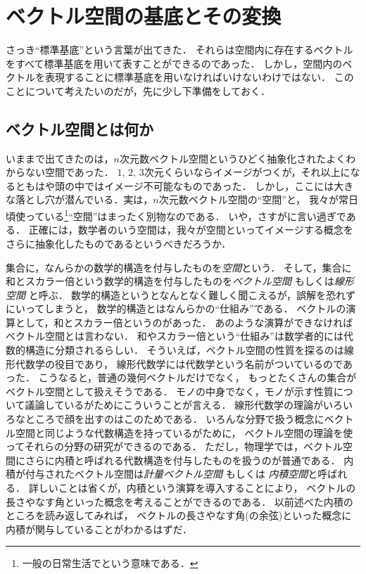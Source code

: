 \section{ベクトル空間の基底とその変換}
さっき``標準基底''という言葉が出てきた．
それらは空間内に存在するベクトルをすべて標準基底を用いて表すことができるのであった．
しかし，空間内のベクトルを表現することに標準基底を用いなければいけないわけではない．
このことについて考えたいのだが，先に少し下準備をしておく．
\subsection{ベクトル空間とは何か}
いままで出てきたのは，$n$次元数ベクトル空間というひどく抽象化されたよくわからない空間であった．
$1,\, 2, \, 3$次元くらいならイメージがつくが，それ以上になるともはや頭の中ではイメージ不可能なものであった．
しかし，ここには大きな落とし穴が潜んでいる．実は，$n$次元数ベクトル空間の``空間''と，
我々が常日頃使っている\footnote{一般の日常生活でという意味である．}``空間''はまったく別物なのである．
いや，さすがに言い過ぎである．
正確には，数学者のいう空間は，我々が空間といってイメージする概念をさらに抽象化したものであるというべきだろうか．

集合に，なんらかの数学的構造を付与したものを\emph{空間}という．
そして，集合に和とスカラー倍という数学的構造を付与したものを\emph{ベクトル空間}
もしくは\emph{線形空間}
と呼ぶ．
数学的構造というとなんとなく難しく聞こえるが，誤解を恐れずにいってしまうと，
数学的構造とはなんらかの``仕組み''である．
ベクトルの演算として，和とスカラー倍というのがあった．
あのような演算ができなければベクトル空間とは言わない．
和やスカラー倍という``仕組み''は数学者的には代数的構造に分類されるらしい．
そういえば，ベクトル空間の性質を探るのは線形代数学の役目であり，
線形代数学には代数学という名前がついているのであった．
こうなると，普通の幾何ベクトルだけでなく，
もっとたくさんの集合がベクトル空間として扱えそうである．
モノの中身でなく，モノが示す性質について議論しているがためにこういうことが言える．
線形代数学の理論がいろいろなところで顔を出すのはこのためである．
いろんな分野で扱う概念にベクトル空間と同じような代数構造を持っているがために，
ベクトル空間の理論を使ってそれらの分野の研究ができるのである．
ただし，物理学では，ベクトル空間にさらに内積と呼ばれる代数構造を付与したものを扱うのが普通である．
内積が付与されたベクトル空間は\emph{計量ベクトル空間}
もしくは
\emph{内積空間}と呼ばれる．
詳しいことは省くが，内積という演算を導入することにより，
ベクトルの長さやなす角といった概念を考えることができるのである．
以前述べた内積のところを読み返してみれば，
ベクトルの長さやなす角(の余弦)といった概念に内積が関与していることがわかるはずだ．

